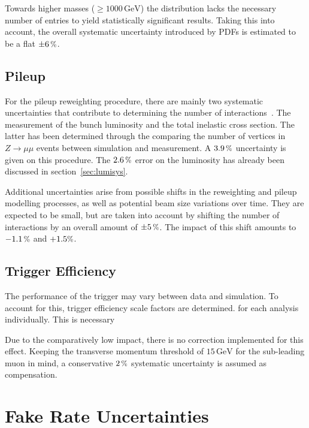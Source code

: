 Towards higher masses ($\geq 1000\,\text{GeV}$) the distribution lacks the necessary number of entries to yield statistically significant results. Taking this into account, the overall systematic uncertainty introduced by PDFs is estimated to be a flat $\pm 6\,\pct$.


\subsection{Pileup}
\label{sec:pusys}

For the pileup reweighting procedure, there are mainly two systematic uncertainties that contribute to determining the number of interactions~\cite{pileupsys}. The measurement of the bunch luminosity and the total inelastic cross section. The latter has been determined through the comparing the number of vertices in $Z \rightarrow \mu\mu$ events between simulation and measurement. A $3.9\,\pct$ uncertainty is given on this procedure. The $2.6\,\pct$ error on the luminosity has already been discussed in section~\ref{sec:lumisys}.

Additional uncertainties arise from possible shifts in the reweighting and pileup modelling processes, as well as potential beam size variations over time. They are expected to be small, but are taken into account by shifting the number of interactions by an overall amount of $\pm 5\,\pct$. The impact of this shift amounts to $-1.1\,\pct$ and $+1.5\pct$.


\subsection{Trigger Efficiency}
\label{sec:trig-eff}

The performance of the trigger may vary between data and simulation. To account for this, trigger efficiency scale factors are determined.  for each analysis individually. This is necessary

Due to the comparatively low impact, there is no correction implemented for this effect. Keeping the transverse momentum threshold of $15\,\text{GeV}$ for the sub-leading muon in mind, a conservative $2\,\pct$ systematic uncertainty is assumed as compensation. 



\section{Fake Rate Uncertainties}
\label{sec:tlsys}

